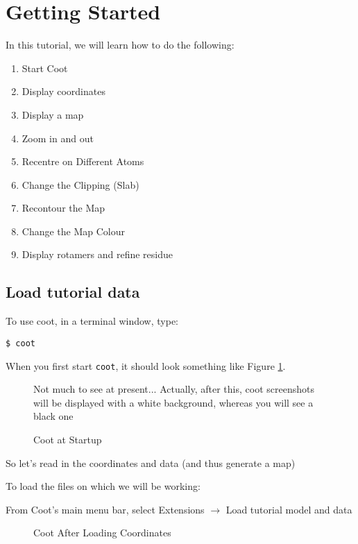 \documentclass{article}
\begin{document}
\section{Getting Started}

In this tutorial, we will learn how to do the following:
\begin{enumerate}
\item Start Coot
\item Display coordinates
\item Display a map
\item Zoom in and out
\item Recentre on Different Atoms
\item Change the Clipping (Slab)
\item Recontour the Map
\item Change the Map Colour
\item Display rotamers and refine residue
\end{enumerate}

\subsection{Load tutorial data}

To use coot, in a terminal window, type:


\texttt{\$ coot}

When you first start \texttt{coot}, it should look
something like Figure \ref{fig:start-coot}.

\begin{figure}[htbp]
  \begin{center}
    \leavevmode
    \epsfxsize 70mm
    \caption{Coot at Startup}{Not much to see at present...
      Actually, after this, coot screenshots will be displayed with a
      white background, whereas you will see a black one}
    \label{fig:start-coot}
  \end{center}
\end{figure}

So let's read in the coordinates and data (and thus generate a map)

To load the files on which we will be working:

From Coot's main menu bar, select
\textsf{Extensions $\rightarrow$ Load tutorial model and data}


\begin{figure}[htbp]
  \begin{center}
    \leavevmode
    \epsfxsize 70mm
    \caption{Coot After Loading Coordinates}
    \label{fig:coordinates-coot}
  \end{center}
\end{figure}
\end{document}
